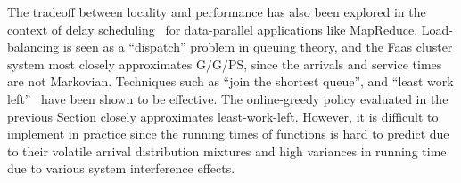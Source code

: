 The tradeoff between locality and performance has also been explored in the context of delay scheduling~\cite{zaharia2010delay} for data-parallel applications like MapReduce.
%
Load-balancing is seen as a ``dispatch'' problem in queuing theory, and the Faas cluster system most closely approximates G/G/PS, since the arrivals and service times are not Markovian.
Techniques such as ``join the shortest queue'', and ``least work left''~\cite{gupta2007analysis} have been shown to be effective.
The online-greedy policy evaluated in the previous Section closely approximates least-work-left.
However, it is difficult to implement in practice since the running times of functions is hard to predict due to their volatile arrival distribution mixtures and high variances in running time due to various system interference effects.




